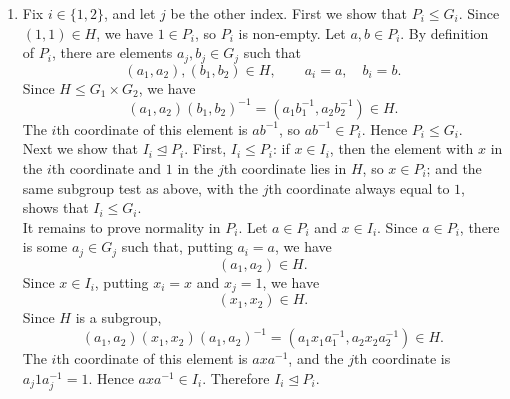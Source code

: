 \documentclass[../Odyssey_Project.tex]{subfiles}
\begin{document}
\begin{solution}
    \phantom{}\par
    \begin{enumerate}
        \item[(a)] Fix $i \in \{1,2\}$, and let $j$ be the other index. First we show that $P_i \leq G_i$. Since $(1,1) \in H$, we have $1 \in P_i$, so $P_i$ is non-empty. Let $a,b \in P_i$. By definition of $P_i$, there are elements $a_j,b_j \in G_j$ such that
    \[
        (a_1,a_2),(b_1,b_2) \in H,
        \qquad
        a_i = a,\quad b_i = b.
    \]
    Since $H \leq G_1 \times G_2$, we have
    \[
        (a_1,a_2)(b_1,b_2)^{-1}
        =
        (a_1b_1^{-1},a_2b_2^{-1})
        \in H.
    \]
    The $i$th coordinate of this element is $ab^{-1}$, so $ab^{-1} \in P_i$. Hence $P_i \leq G_i$. \\
    Next we show that $I_i \trianglelefteq P_i$. First, $I_i \leq P_i$: if $x \in I_i$, then the element with $x$ in the $i$th coordinate and $1$ in the $j$th coordinate lies in $H$, so $x \in P_i$; and the same subgroup test as above, with the $j$th coordinate always equal to $1$, shows that $I_i \leq G_i$. \\
    It remains to prove normality in $P_i$. Let $a \in P_i$ and $x \in I_i$. Since $a \in P_i$, there is some $a_j \in G_j$ such that, putting $a_i = a$, we have
    \[
        (a_1,a_2) \in H.
    \]
    Since $x \in I_i$, putting $x_i = x$ and $x_j = 1$, we have
    \[
        (x_1,x_2) \in H.
    \]
    Since $H$ is a subgroup,
    \[
        (a_1,a_2)(x_1,x_2)(a_1,a_2)^{-1}
        =
        (a_1x_1a_1^{-1},a_2x_2a_2^{-1})
        \in H.
    \]
    The $i$th coordinate of this element is $axa^{-1}$, and the $j$th coordinate is $a_j1a_j^{-1} = 1$. Hence $axa^{-1} \in I_i$. Therefore $I_i \trianglelefteq P_i$.


\end{enumerate}
\end{solution}
\end{document}
